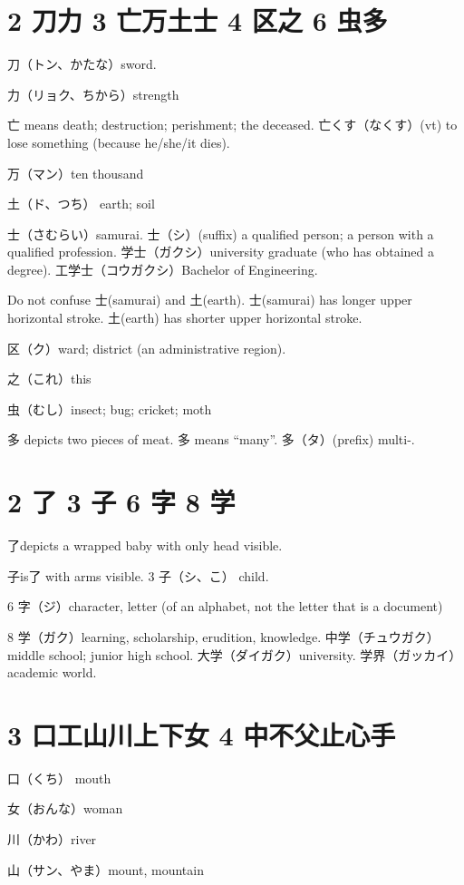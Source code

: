 \section{2 刀力 3 亡万土士 4 区之 6 虫多}

刀（トン、かたな）sword.

力（リョク、ちから）strength

亡 means death; destruction; perishment; the deceased.
亡くす（なくす）(vt) to lose something (because he/she/it dies).

万（マン）ten thousand

土（ド、つち） earth; soil

士（さむらい）samurai.
士（シ）(suffix)
a qualified person;
a person with a qualified profession.
学士（ガクシ）university graduate (who has obtained a degree).
工学士（コウガクシ）Bachelor of Engineering.

Do not confuse 士(samurai) and 土(earth).
士(samurai) has longer upper horizontal stroke.
土(earth) has shorter upper horizontal stroke.

区（ク）ward; district (an administrative region).

之（これ）this

虫（むし）insect; bug; cricket; moth

多 depicts two pieces of meat.
多 means ``many''.
多（タ）(prefix) multi-.

\section{2 了 3 子 6 字 8 学}

了depicts a wrapped baby with only head visible.

子is了 with arms visible.
3 子（シ、こ） child.

6 字（ジ）character, letter (of an alphabet, not the letter that is a document)

8 学（ガク）learning, scholarship, erudition, knowledge.
中学（チュウガク）middle school; junior high school.
大学（ダイガク）university.
学界（ガッカイ）academic world.

\section{3 口工山川上下女 4 中不父止心手}

口（くち） mouth

女（おんな）woman

川（かわ）river

山（サン、やま）mount, mountain

